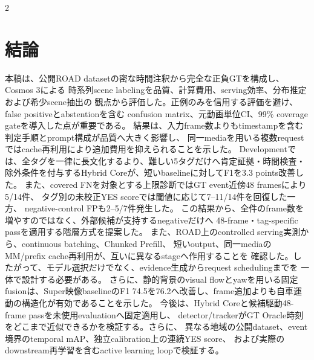 \documentclass[9pt,a4paper]{extarticle}
\begin{document}
\begin{multicols}{2}
\section{結論}
本稿は、公開ROAD datasetの密な時間注釈から完全な正負GTを構成し、Cosmos 3による
時系列scene labelingを品質、計算費用、serving効率、分布推定および希少scene抽出の
観点から評価した。正例のみを信用する評価を避け、false positiveとabstentionを含む
confusion matrix、元動画単位CI、99\% coverage gateを導入した点が重要である。
結果は、入力frame数よりもtimestampを含む判定手順とprompt構成が品質へ大きく影響し、
同一mediaを用いる複数requestではcache再利用により追加費用を抑えられることを示した。
Developmentでは、全タグを一律に長文化するより、難しい5タグだけへ肯定証拠・時間検査・
除外条件を付与するHybrid Coreが、短いbaselineに対してF1を3.3 points改善した。
また、covered FNを対象とする上限診断ではGT event近傍48 framesにより5/14件、
タグ別の未校正YES scoreでは閾値に応じて7--11/14件を回復した一方、
negative-control FPも2--5/7件発生した。
この結果から、全件のframe数を増やすのではなく、外部候補が支持するnegativeだけへ
48-frame・tag-specific passを適用する階層方式を提案した。
また、ROAD上のcontrolled serving実測から、continuous batching、Chunked Prefill、
短いoutput、同一mediaのMM/prefix cache再利用が、互いに異なるstageへ作用することを
確認した。したがって、モデル選択だけでなく、evidence生成からrequest schedulingまでを
一体で設計する必要がある。
さらに、静的背景のvisual flowとyawを用いる固定fusionは、Super映像baselineのF1 74.5を76.2へ改善し、frame追加よりも自車運動の構造化が有効であることを示した。
今後は、Hybrid Coreと候補駆動48-frame passを未使用evaluationへ固定適用し、
detector/trackerがGT Oracle時刻をどこまで近似できるかを検証する。さらに、
異なる地域の公開dataset、event境界のtemporal mAP、独立calibration上の連続YES score、
および実際のdownstream再学習を含むactive learning loopで検証する。


\end{multicols}
\end{document}
